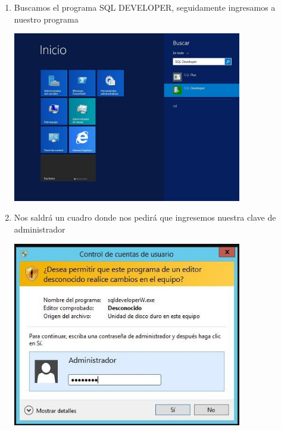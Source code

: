 \begin{enumerate}[1.]
	\hfill \break
	\hfill \break
	\hfill \break
	\hfill \break
	\hfill \break
	\hfill \break
	\hfill \break
	\hfill \break
	\item Buscamos el programa SQL DEVELOPER, seguidamente ingresamos a nuestro programa\\
	\begin{center}
	\includegraphics[width=10cm]{./Imagenes/mire8} 
	\end{center}

	\item Nos saldr\'a un cuadro donde nos pedir\'a que ingresemos nuestra clave de administrador\\
	\begin{center}
	\includegraphics[width=10cm]{./Imagenes/angela25} 
	\end{center}


\end{enumerate}
